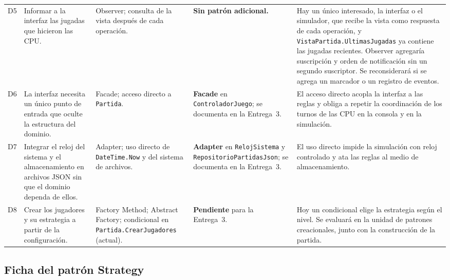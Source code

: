 {\begin{longtable}{@{}C{0.6cm}L{3.3cm}L{2.7cm}L{2.2cm}L{5.7cm}@{}}
  D5 & Informar a la interfaz las jugadas que hicieron las CPU. & Observer; consulta de la vista después de cada operación. & \textbf{Sin patrón adicional.} & Hay un único interesado, la interfaz o el simulador, que recibe la vista como respuesta de cada operación, y \texttt{VistaPartida.UltimasJugadas} ya contiene las jugadas recientes. Observer agregaría suscripción y orden de notificación sin un segundo suscriptor. Se reconsiderará si se agrega un marcador o un registro de eventos. \\ \filasep
  D6 & La interfaz necesita un único punto de entrada que oculte la estructura del dominio. & Facade; acceso directo a \texttt{Partida}. & \textbf{Facade} en \texttt{Controlador\allowbreak Juego}; se documenta en la Entrega~3. & El acceso directo acopla la interfaz a las reglas y obliga a repetir la coordinación de los turnos de las CPU en la consola y en la simulación. \\ \filasep
  D7 & Integrar el reloj del sistema y el almacenamiento en archivos JSON sin que el dominio dependa de ellos. & Adapter; uso directo de \texttt{DateTime.\allowbreak Now} y del sistema de archivos. & \textbf{Adapter} en \texttt{Reloj\allowbreak Sistema} y \texttt{Repositorio\allowbreak Partidas\allowbreak Json}; se documenta en la Entrega~3. & El uso directo impide la simulación con reloj controlado y ata las reglas al medio de almacenamiento. \\ \filasep
  D8 & Crear los jugadores y su estrategia a partir de la configuración. & Factory Method; Abstract Factory; condicional en \texttt{Partida.\allowbreak Crear\allowbreak Jugadores} (actual). & \textbf{Pendiente} para la Entrega~3. & Hoy un condicional elige la estrategia según el nivel. Se evaluará en la unidad de patrones creacionales, junto con la construcción de la partida. \\
\end{longtable}}

\clearpage
\subsection{Ficha del patrón Strategy}\label{sec:ficha-strategy}

